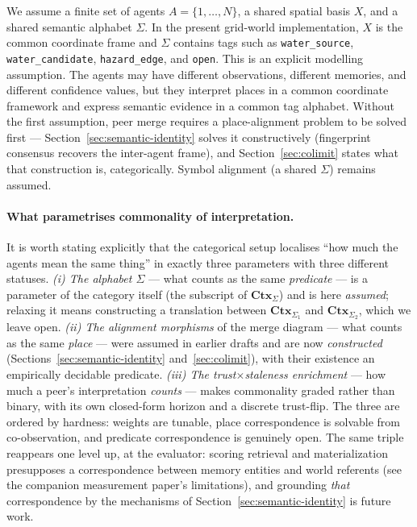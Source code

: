 \documentclass{article}
\begin{document}
We assume a finite set of agents $A=\{1,\ldots,N\}$, a shared spatial
basis $X$, and a shared semantic alphabet $\Sigma$. In the present
grid-world implementation, $X$ is the common coordinate frame and
$\Sigma$ contains tags such as \texttt{water\_source},
\texttt{water\_candidate}, \texttt{hazard\_edge}, and \texttt{open}.
This is an explicit modelling assumption. The agents may have different
observations, different memories, and different confidence values, but
they interpret places in a common coordinate framework and express
semantic evidence in a common tag alphabet. Without the first
assumption, peer merge requires a place-alignment problem to be solved
first --- Section~\ref{sec:semantic-identity} solves it constructively
(fingerprint consensus recovers the inter-agent frame), and
Section~\ref{sec:colimit} states what that construction is,
categorically. Symbol alignment (a shared $\Sigma$) remains assumed.

\paragraph{What parametrises commonality of interpretation.} It is
worth stating explicitly that the categorical setup localises ``how
much the agents mean the same thing'' in exactly three parameters with
three different statuses. \emph{(i) The alphabet $\Sigma$} --- what
counts as the same \emph{predicate} --- is a parameter of the category
itself (the subscript of $\mathbf{Ctx}_\Sigma$) and is here
\emph{assumed}; relaxing it means constructing a translation between
$\mathbf{Ctx}_{\Sigma_1}$ and $\mathbf{Ctx}_{\Sigma_2}$, which we leave
open. \emph{(ii) The alignment morphisms} of the merge diagram ---
what counts as the same \emph{place} --- were assumed in earlier
drafts and are now \emph{constructed}
(Sections~\ref{sec:semantic-identity} and~\ref{sec:colimit}), with
their existence an empirically decidable predicate. \emph{(iii) The
trust$\times$staleness enrichment} --- how much a peer's
interpretation \emph{counts} --- makes commonality graded rather than
binary, with its own closed-form horizon and a discrete trust-flip.
The three are ordered by hardness: weights are tunable, place
correspondence is solvable from co-observation, and predicate
correspondence is genuinely open. The same triple reappears one level
up, at the evaluator: scoring retrieval and materialization
presupposes a correspondence between memory entities and world
referents (see the companion measurement paper's limitations), and
grounding \emph{that} correspondence by the mechanisms of
Section~\ref{sec:semantic-identity} is future work.
\end{document}

